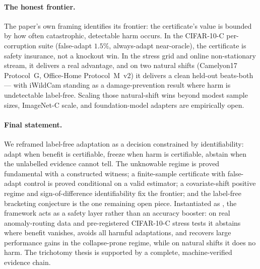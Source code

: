 \paragraph{The honest frontier.}
The paper's own framing identifies its frontier: the certificate's value is
bounded by how often catastrophic, detectable harm occurs.  In the CIFAR-10-C
per-corruption suite (false-adapt $1.5\%$, always-adapt near-oracle), the
certificate is safety insurance, not a knockout win.  In the stress grid and
online non-stationary stream, it delivers a real advantage, and on two natural
shifts (Camelyon17 Protocol~G, Office-Home Protocol~M~v2) it delivers a clean
held-out beats-both --- with iWildCam standing as a damage-prevention result where
harm is undetectable label-free.  Scaling those natural-shift wins beyond modest
sample sizes, ImageNet-C scale, and foundation-model adapters are empirically open.

\paragraph{Final statement.}
We reframed label-free adaptation as a decision constrained by identifiability:
adapt when benefit is certifiable, freeze when harm is certifiable, abstain when
the unlabelled evidence cannot tell.  The unknowable regime is proved fundamental
with a constructed witness; a finite-sample certificate with false-adapt control is
proved conditional on a valid estimator; a covariate-shift positive regime and
sign-of-difference identifiability fix the frontier; and the label-free bracketing
conjecture is the one remaining open piece.  Instantiated as \KGA, the framework
acts as a safety layer rather than an accuracy booster: on real anomaly-routing
data and pre-registered CIFAR-10-C stress tests it abstains where benefit
vanishes, avoids all harmful adaptations, and recovers large performance gains in
the collapse-prone regime, while on natural shifts it does no harm.  The trichotomy
thesis is supported by a complete, machine-verified evidence chain.
